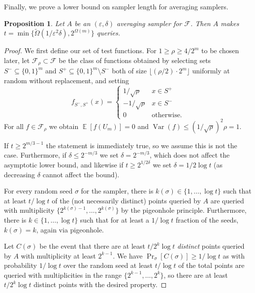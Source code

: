 \documentclass[11pt]{article}
\numberwithin{equation}{section}
\newtheorem{proposition}[theorem]{Proposition}
\theoremstyle{definition}
\theoremstyle{plain}
\newcommand{\eps}{\varepsilon}
\newcommand{\zo}{\{0,1\}}
\newcommand{\cF}{\mathcal{F}}
\DeclareMathOperator*{\E}{\mathbb{E}}
\begin{document}
Finally, we prove a lower bound on sampler length for averaging samplers. %
\begin{proposition}
Let $A$ be an $(\eps,\delta)$ averaging sampler for $\cF$. Then $A$ makes $t=\min\{\widetilde{\Omega}(1/\eps^2\delta),2^{\Omega(m)}\}$ queries.
\end{proposition}
\begin{proof}
We first define our set of test functions. For $1\geq \rho\geq 4/2^{m}$ to be chosen later, let $\cF_\rho\subset \cF$ be the class of functions obtained by selecting sets $S^-\subseteq \zo^m$ and $S^+\subseteq \zo^m\setminus S^-$ both of size $\lfloor (\rho/2)\cdot 2^m\rfloor$ uniformly at random without replacement, and setting
\[f_{S^-,S^+}(x) = \begin{cases}
1/\sqrt{\rho} & x\in S^+\\
-1/\sqrt{\rho} & x \in S^-\\
0 & \text{otherwise.}\end{cases}\]
For all $f\in \cF_\rho$ we obtain $\E[f(U_m)]=0$ and $\operatorname{Var}(f) \leq  (1/\sqrt{\rho})^2\rho=1$.


If $t\geq 2^{m/3-1}$ the statement is immediately true, so we assume this is not the case. Furthermore, if $\delta \leq 2^{-m/3}$ we set $\delta=2^{-m/3}$, which does not affect the asymptotic lower bound, and likewise if $t\geq 2^{1/2\delta}$ we set $\delta=1/2\log t$ (as decreasing $\delta$ cannot affect the bound).

For every random seed $\sigma$ for the sampler, there is $k(\sigma)\in \{1,\ldots,\log t\}$ such that at least $t/\log t$ of the (not necessarily distinct) points queried by $A$ are queried with multiplicity $\{2^{k(\sigma)-1},\ldots,2^{k(\sigma)}\}$ by the pigeonhole principle. Furthermore, there is $k\in \{1,\ldots,\log t\}$ such that for at least a $1/\log t$ fraction of the seeds, $k(\sigma)=k$, again via pigeonhole. 

Let $C(\sigma)$ be the event that there are at least $t/2^k\log t$ \textit{distinct} points queried by $A$ with multiplicity at least $2^{k-1}$. We have $\Pr_\sigma[C(\sigma)]\geq 1/\log t$ as with probability $1/\log t$ over the random seed at least $t/\log t$ of the total points are queried with multiplicities in the range $\{2^{k-1},\ldots,2^k\}$, so there are at least $t/2^{k}\log t$ distinct points with the desired property.


\end{proof}
\end{document}
